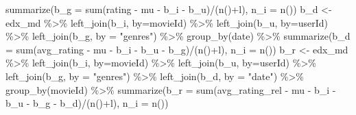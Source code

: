 \documentclass[
]{article}
\newenvironment{Shaded}{}{}
\newcommand{\AttributeTok}[1]{\textcolor[rgb]{0.49,0.56,0.16}{#1}}
\newcommand{\FunctionTok}[1]{\textcolor[rgb]{0.02,0.16,0.49}{#1}}
\newcommand{\NormalTok}[1]{#1}
\newcommand{\OtherTok}[1]{\textcolor[rgb]{0.00,0.44,0.13}{#1}}
\newcommand{\SpecialCharTok}[1]{\textcolor[rgb]{0.25,0.44,0.63}{#1}}
\newcommand{\StringTok}[1]{\textcolor[rgb]{0.25,0.44,0.63}{#1}}
\begin{document}
\begin{Shaded}
\begin{Highlighting}[]
    \FunctionTok{summarize}\NormalTok{(}\AttributeTok{b\_g =} \FunctionTok{sum}\NormalTok{(rating }\SpecialCharTok{{-}}\NormalTok{ mu }\SpecialCharTok{{-}}\NormalTok{ b\_i }\SpecialCharTok{{-}}\NormalTok{ b\_u)}\SpecialCharTok{/}\NormalTok{(}\FunctionTok{n}\NormalTok{()}\SpecialCharTok{+}\NormalTok{l), }\AttributeTok{n\_i =} \FunctionTok{n}\NormalTok{())}
\NormalTok{  b\_d }\OtherTok{\textless{}{-}}\NormalTok{ edx\_md }\SpecialCharTok{\%\textgreater{}\%}
    \FunctionTok{left\_join}\NormalTok{(b\_i, }\AttributeTok{by=}\StringTok{\textquotesingle{}movieId\textquotesingle{}}\NormalTok{) }\SpecialCharTok{\%\textgreater{}\%}
    \FunctionTok{left\_join}\NormalTok{(b\_u, }\AttributeTok{by=}\StringTok{\textquotesingle{}userId\textquotesingle{}}\NormalTok{) }\SpecialCharTok{\%\textgreater{}\%} 
    \FunctionTok{left\_join}\NormalTok{(b\_g, }\AttributeTok{by =} \StringTok{"genres"}\NormalTok{) }\SpecialCharTok{\%\textgreater{}\%} 
    \FunctionTok{group\_by}\NormalTok{(date) }\SpecialCharTok{\%\textgreater{}\%} 
    \FunctionTok{summarize}\NormalTok{(}\AttributeTok{b\_d =} \FunctionTok{sum}\NormalTok{(avg\_rating }\SpecialCharTok{{-}}\NormalTok{ mu }\SpecialCharTok{{-}}\NormalTok{ b\_i }\SpecialCharTok{{-}}\NormalTok{ b\_u }\SpecialCharTok{{-}}\NormalTok{ b\_g)}\SpecialCharTok{/}\NormalTok{(}\FunctionTok{n}\NormalTok{()}\SpecialCharTok{+}\NormalTok{l), }\AttributeTok{n\_i =} \FunctionTok{n}\NormalTok{())}
\NormalTok{  b\_r }\OtherTok{\textless{}{-}}\NormalTok{ edx\_md }\SpecialCharTok{\%\textgreater{}\%}
    \FunctionTok{left\_join}\NormalTok{(b\_i, }\AttributeTok{by=}\StringTok{\textquotesingle{}movieId\textquotesingle{}}\NormalTok{) }\SpecialCharTok{\%\textgreater{}\%}
    \FunctionTok{left\_join}\NormalTok{(b\_u, }\AttributeTok{by=}\StringTok{\textquotesingle{}userId\textquotesingle{}}\NormalTok{) }\SpecialCharTok{\%\textgreater{}\%} 
    \FunctionTok{left\_join}\NormalTok{(b\_g, }\AttributeTok{by =} \StringTok{"genres"}\NormalTok{) }\SpecialCharTok{\%\textgreater{}\%} 
    \FunctionTok{left\_join}\NormalTok{(b\_d, }\AttributeTok{by =} \StringTok{"date"}\NormalTok{) }\SpecialCharTok{\%\textgreater{}\%} 
    \FunctionTok{group\_by}\NormalTok{(movieId) }\SpecialCharTok{\%\textgreater{}\%} 
    \FunctionTok{summarize}\NormalTok{(}\AttributeTok{b\_r =} \FunctionTok{sum}\NormalTok{(avg\_rating\_rel }\SpecialCharTok{{-}}\NormalTok{ mu }\SpecialCharTok{{-}}\NormalTok{ b\_i }\SpecialCharTok{{-}}\NormalTok{ b\_u }\SpecialCharTok{{-}}\NormalTok{ b\_g }\SpecialCharTok{{-}}\NormalTok{ b\_d)}\SpecialCharTok{/}\NormalTok{(}\FunctionTok{n}\NormalTok{()}\SpecialCharTok{+}\NormalTok{l), }\AttributeTok{n\_i =} \FunctionTok{n}\NormalTok{())}


\end{Highlighting}
\end{Shaded}
\end{document}

